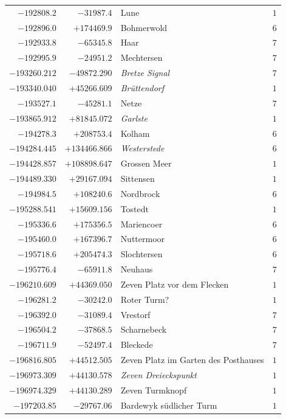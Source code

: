 \begin{center}
\begin{tabular}{r|r|p{170pt}|r}
\(-192808.2\)&\(-31987.4\)&Lune&\(1\)\\
\(-192896.0\)&\(+174469.9\)&Bohmerwold&\(6\)\\
\(-192933.8\)&\(-65345.8\)&Haar&\(7\)\\
\(-192995.9\)&\(-24951.2\)&Mechtersen&\(7\)\\
\(-193260.212\)&\(-49872.290\)&\textit{Bretze Signal}&\(7\)\\
\(-193340.040\)&\(+45266.609\)&\textit{Brüttendorf}&\(1\)\\
\(-193527.1\)&\(-45281.1\)&Netze&\(7\)\\
\(-193865.912\)&\(+81845.072\)&\textit{Garlste}&\(1\)\\
\(-194278.3\)&\(+208753.4\)&Kolham&\(6\)\\
\(-194284.445\)&\(+134466.866\)&\textit{Westerstede}&\(6\)\\
\(-194428.857\)&\(+108898.647\)&Grossen Meer&\(1\)\\
\(-194489.330\)&\(+29167.094\)&Sittensen&\(1\)\\
\(-194984.5\)&\(+108240.6\)&Nordbrock&\(6\)\\
\(-195288.541\)&\(+15609.156\)&Tostedt&\(1\)\\
\(-195336.6\)&\(+175356.5\)&Mariencoer&\(6\)\\
\(-195460.0\)&\(+167396.7\)&Nuttermoor&\(6\)\\
\(-195718.6\)&\(+205474.3\)&Slochtersen&\(6\)\\
\(-195776.4\)&\(-65911.8\)&Neuhaus&\(7\)\\
\(-196210.609\)&\(+44369.050\)&Zeven Platz vor dem Flecken&\(1\)\\
\(-196281.2\)&\(-30242.0\)&Roter Turm?&\(1\)\\
\(-196392.0\)&\(-31089.4\)&Vrestorf&\(7\)\\
\(-196504.2\)&\(-37868.5\)&Scharnebeck&\(7\)\\
\(-196711.9\)&\(-52497.4\)&Bleckede&\(7\)\\
\(-196816.805\)&\(+44512.505\)&Zeven Platz im Garten des Posthauses&\(1\)\\
\(-196973.309\)&\(+44130.578\)&\textit{Zeven Dreieckspunkt}&\(1\)\\
\(-196974.329\)&\(+44130.289\)&Zeven Turmknopf&\(1\)\\
\(-197203.85\)&\(-29767.06\)&Bardewyk südlicher Turm&\(1\)\\
\hline\end{tabular}\endgroup\end{center}
